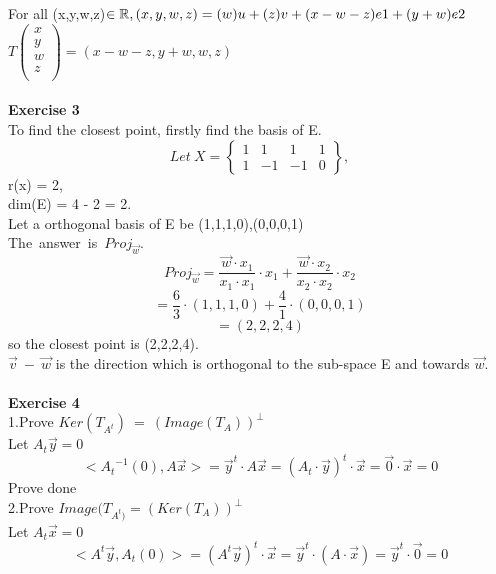 \documentclass[12pt]{amsart}
\begin{document}
For all (x,y,w,z)$\in \mathbb{R},\\
(x,y,w,z)= (w)u+(z)v+(x-w-z)e1+(y+w)e2$\\

$T\begin{pmatrix}
x\\
y\\
w\\
z\\
\end{pmatrix} = (x-w-z, y+w, w,z)$\\
\\
\textbf{Exercise 3}\\
To find the closest point, firstly find the basis of E.\\
$$
Let\ X = 
  \left\{
 \begin{matrix}
   1 & 1 & 1 & 1 \\
   1 & -1 & -1 & 0 
  \end{matrix}
  \right\},
$$
r(x) = 2,\\
dim(E) = 4 - 2 = 2.\\
Let a orthogonal basis of E be {(1,1,1,0),(0,0,0,1)}\\
The\ answer\ is\ $Proj_{\vec w}$.
\begin{displaymath}
Proj_{\vec w}=
\frac{\vec w \cdot x_1}{x_1 \cdot x_1}\cdot x_1 +
\frac{\vec w \cdot x_2}{x_2 \cdot x_2}\cdot x_2
\end{displaymath}
\begin{displaymath}
=
\frac{6}{3} \cdot (1,1,1,0) +
\frac{4}{1} \cdot (0,0,0,1)
\end{displaymath}
\begin{displaymath}
=(2,2,2,4)
\end{displaymath}
so the closest point is (2,2,2,4).\\
$\vec v\ -\ \vec w$ is the direction which is orthogonal to the sub-space E and towards $\vec w$.\\
\\
\textbf{Exercise 4}\\
1.Prove $Ker(T_{A^t}) \ =\ {(Image(T_A))}^\perp$\\
Let $A_t\vec y=0$\\
$$
<{A_t}^{-1}(0),A \vec x> = {\vec y}^t \cdot A\vec x = (A_t\cdot\vec y)^t\cdot \vec x = \vec 0\cdot \vec x= 0
$$
Prove done\\
2.Prove ${Image(T_{A^t)}}=(Ker(T_A))^\perp$\\
Let $A_t\vec x=0$\\
$$
<A^t\vec y,{A_t}(0)>=(A^t\vec y)^t\cdot \vec x={\vec y}^t\cdot(A\cdot \vec x)= {\vec y}^t\cdot \vec 0 = 0
$$
\end{document}
